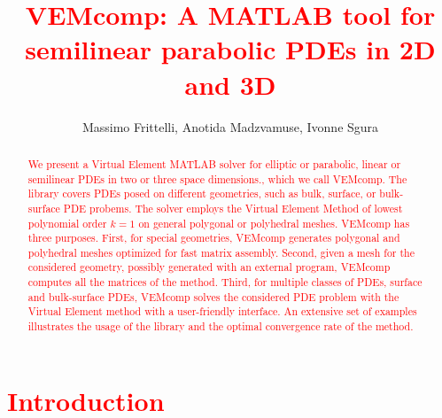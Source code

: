 \documentclass[a4paper]{article}
\newcommand{\red}[1]{\textcolor{red}{#1}}
\begin{document}
 
\title{\red{VEMcomp: A MATLAB tool for semilinear parabolic PDEs in 2D and 3D}}
\author{Massimo Frittelli, Anotida Madzvamuse, Ivonne Sgura}

\maketitle

\begin{abstract}
\red{We present a Virtual Element MATLAB solver for elliptic or parabolic, linear or semilinear PDEs in two or three space dimensions., which we call VEMcomp. The library covers PDEs posed on different geometries, such as bulk, surface, or bulk-surface PDE probems. The solver employs the Virtual Element Method of lowest polynomial order $k=1$ on general polygonal or polyhedral meshes.  VEMcomp has three purposes.
First,  for special geometries,  VEMcomp generates polygonal and polyhedral meshes optimized for fast matrix assembly. Second, given a mesh for the considered geometry, possibly generated with an external program, VEMcomp computes all the matrices of the method.
Third, for multiple classes of PDEs, surface and bulk-surface PDEs,  VEMcomp solves the considered PDE problem with the Virtual Element method with a user-friendly interface.  An extensive set of examples illustrates the usage of the library and the optimal convergence rate of the method.}
\end{abstract}

\section{\red{Introduction}}
\end{document}
